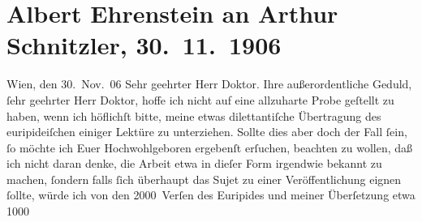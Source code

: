 

         
         \renewcommand{\erwaehntePersonen}{Personen:  Euripides}
         \renewcommand{\erwaehnteOrte}{Orte: Wien}
         \renewcommand{\erwaehnteWerke}{Werke: Helena}
               \section[Albert Ehrenstein an Arthur Schnitzler, 30. 11. 1906]{ Albert Ehrenstein an Arthur Schnitzler, 30. 11. 1906}\nopagebreak{}\rehead{ }\begin{ledgroupsized}[t]{13cm}\normalsize\beginnumbering \toendnotes[C]{\smallbreak\pagebreak[2]} 
\toendnotes[C]{\smallbreak}\pstart
           \raggedleft{}{\pb}Wien, den 30. Nov. 06\pend
           \pstart{}Sehr geehrter Herr Doktor.\pend\pstart
           Ihre außerordentliche Geduld, ſehr geehrter Herr Doktor, hoffe ich nicht auf eine
                    allzuharte Probe geſtellt zu haben, wenn ich höflichſt bitte, meine etwas
                    dilettantiſche Übertragung des euripideiſchen\label{K_L01640_1v}\label{K_L01640_1h} einiger Lektüre zu
                    unterziehen. Sollte dies aber doch der Fall ſein, ſo möchte ich Euer
                    Hochwohlgeboren ergebenſt erſuchen, beachten zu wollen, daß ich nicht daran
                    denke, die Arbeit etwa in dieſer Form {\pb}irgendwie bekannt zu machen, ſondern falls ſich überhaupt das Sujet zu einer
                    Veröffentlichung eignen ſollte, würde ich von den 2000 Verſen des Euripides und meiner Überſetzung etwa 1000

\end{ledgroupsized}
